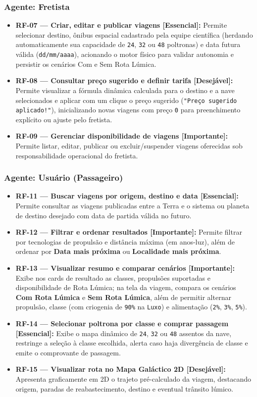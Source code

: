 \documentclass[12pt, a4paper]{article}
\begin{document}
\subsubsection{Agente: Fretista}
\begin{itemize}
    \item \textbf{RF-07 --- Criar, editar e publicar viagens [Essencial]:} Permite selecionar destino, ônibus espacial cadastrado pela equipe científica (herdando automaticamente sua capacidade de \texttt{24}, \texttt{32} ou \texttt{48} poltronas) e data futura válida (\texttt{dd/mm/aaaa}), acionando o motor físico para validar autonomia e persistir os cenários Com e Sem Rota Lúmica.
    \item \textbf{RF-08 --- Consultar preço sugerido e definir tarifa [Desejável]:} Permite visualizar a fórmula dinâmica calculada para o destino e a nave selecionados e aplicar com um clique o preço sugerido (\texttt{"Preço sugerido aplicado!"}), inicializando novas viagens com preço \texttt{0} para preenchimento explícito ou ajuste pelo fretista.
    \item \textbf{RF-09 --- Gerenciar disponibilidade de viagens [Importante]:} Permite listar, editar, publicar ou excluir/suspender viagens oferecidas sob responsabilidade operacional do fretista.
\end{itemize}

\subsubsection{Agente: Usuário (Passageiro)}
\begin{itemize}
    \item \textbf{RF-11 --- Buscar viagens por origem, destino e data [Essencial]:} Permite consultar as viagens publicadas entre a Terra e o sistema ou planeta de destino desejado com data de partida válida no futuro.
    \item \textbf{RF-12 --- Filtrar e ordenar resultados [Importante]:} Permite filtrar por tecnologias de propulsão e distância máxima (em anos-luz), além de ordenar por \textbf{Data mais próxima} ou \textbf{Localidade mais próxima}.
    \item \textbf{RF-13 --- Visualizar resumo e comparar cenários [Importante]:} Exibe nos cards de resultado as classes, propulsões suportadas e disponibilidade de Rota Lúmica; na tela da viagem, compara os cenários \textbf{Com Rota Lúmica} e \textbf{Sem Rota Lúmica}, além de permitir alternar propulsão, classe (com criogenia de \texttt{90\%} na \texttt{Luxo}) e alimentação (\texttt{2\%}, \texttt{3\%}, \texttt{5\%}).
    \item \textbf{RF-14 --- Selecionar poltrona por classe e comprar passagem [Essencial]:} Exibe o mapa dinâmico de \texttt{24}, \texttt{32} ou \texttt{48} assentos da nave, restringe a seleção à classe escolhida, alerta caso haja divergência de classe e emite o comprovante de passagem.
    \item \textbf{RF-15 --- Visualizar rota no Mapa Galáctico 2D [Desejável]:} Apresenta graficamente em 2D o trajeto pré-calculado da viagem, destacando origem, paradas de reabastecimento, destino e eventual trânsito lúmico.
\end{itemize}
\end{document}
